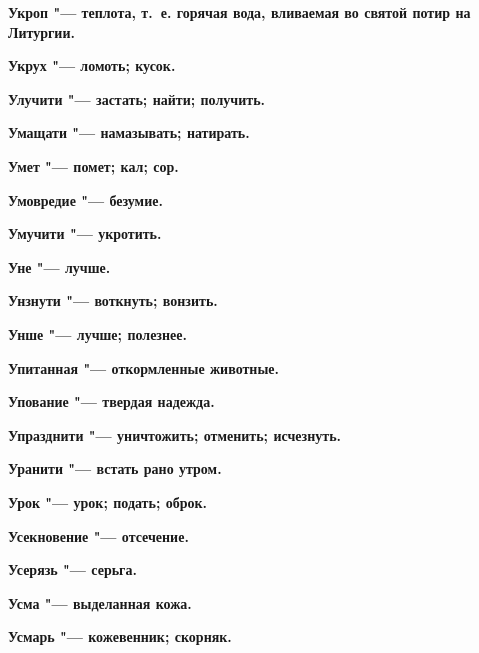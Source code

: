 \begin{mymulticols}{2}
\bfseries Укроп\normalfont{} "--- теплота, т.~е. горячая вода, вливаемая во святой потир на Литургии. 




\bfseries Укрух\normalfont{} "--- ломоть; кусок. 




\bfseries Улучити\normalfont{} "--- застать; найти; получить. 




\bfseries Умащати\normalfont{} "--- намазывать; натирать. 




\bfseries Умет\normalfont{} "--- помет; кал; сор. 




\bfseries Умовредие\normalfont{} "--- безумие. 




\bfseries Умучити\normalfont{} "--- укротить. 




\bfseries Уне\normalfont{} "--- лучше. 




\bfseries Унзнути\normalfont{} "--- воткнуть; вонзить. 




\bfseries Унше\normalfont{} "--- лучше; полезнее. 




\bfseries Упитанная\normalfont{} "--- откормленные животные. 




\bfseries Упование\normalfont{} "--- твердая надежда. 




\bfseries Упразднити\normalfont{} "--- уничтожить; отменить; исчезнуть. 




\bfseries Уранити\normalfont{} "--- встать рано утром. 




\bfseries Урок\normalfont{} "--- урок; подать; оброк. 




\bfseries Усекновение\normalfont{} "--- отсечение. 




\bfseries Усерязь\normalfont{} "--- серьга. 




\bfseries Усма\normalfont{} "--- выделанная кожа. 




\bfseries Усмарь\normalfont{} "--- кожевенник; скорняк. 





\end{mymulticols}
